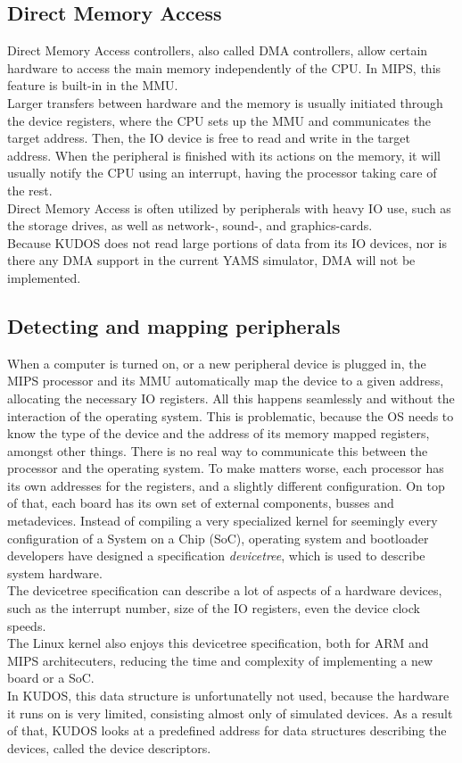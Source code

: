 \subsection{Direct Memory Access}
Direct Memory Access controllers, also called DMA controllers, allow certain
hardware to access the main memory independently of the CPU.
In MIPS, this feature is built-in in the MMU.\\
Larger transfers between hardware and the memory is usually initiated through
the device registers, where the CPU sets up the MMU and communicates the target
address. Then, the IO device is free to read and write in the target address.
When the peripheral is finished with its actions on the memory, it will usually
notify the CPU using an interrupt, having the processor taking care of the rest.\\
Direct Memory Access is often utilized by peripherals with heavy IO use, such
as the storage drives, as well as network-, sound-, and graphics-cards.\\
Because KUDOS does not read large portions of data from its IO devices, nor is
there any DMA support in the current YAMS simulator, DMA will not be implemented.

\subsection{Detecting and mapping peripherals}
When a computer is turned on, or a new peripheral device is plugged in, the MIPS
processor and its MMU automatically map the device to a given address, allocating
the necessary IO registers. All this happens seamlessly and without the interaction
of the operating system. This is problematic, because the OS needs to know the
type of the device and the address of its memory mapped registers, amongst other
things. There is no real way to communicate this between the processor and the
operating system. To make matters worse, each processor has its own addresses
for the registers, and a slightly different configuration. On top of that, each
board has its own set of external components, busses and metadevices\cite{devicetree_spec}\cite{xillybus:devicetree}.
Instead of compiling a very specialized kernel for seemingly every configuration
of a System on a Chip (SoC), operating system and bootloader developers have
designed a specification \emph{devicetree}, which is used to describe system
hardware\cite{devicetree_spec}.\\
The devicetree specification can describe a lot of aspects of a hardware devices,
such as the interrupt number, size of the IO registers, even the device clock
speeds.\\
The Linux kernel also enjoys this devicetree specification, both for ARM and
MIPS architecuters\cite[\texttt{linux-4.6/arch/mips/boot/dts}]{linux}, reducing the time
and complexity of implementing a new board or a SoC.\\
In KUDOS, this data structure is unfortunatelly not used, because the hardware
it runs on is very limited, consisting almost only of simulated devices. As
a result of that, KUDOS looks at a predefined address for data structures
describing the devices, called the device descriptors.

